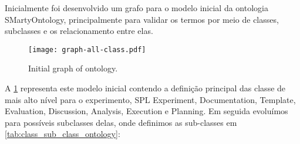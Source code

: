 Inicialmente foi desenvolvido um grafo para o modelo inicial da ontologia SMartyOntology, principalmente para validar os termos por meio de classes, subclasses e os relacionamento entre elas.

\begin{figure}[ht]
	\centering 
	\texttt{[image: graph-all-class.pdf]}
	\caption{Initial graph of ontology.}
	\label{figure:graph-all-class}
\end{figure}

A \ref{figure:graph-all-class} representa este modelo inicial contendo a definição principal das classe de mais alto nível para o experimento, SPL Experiment, Documentation, Template, Evaluation, Discussion, Analysis, Execution e Planning. Em seguida evoluímos para possíveis subclasses delas, onde definimos as sub-classes em \ref{tab:class_sub_class_ontology}:

